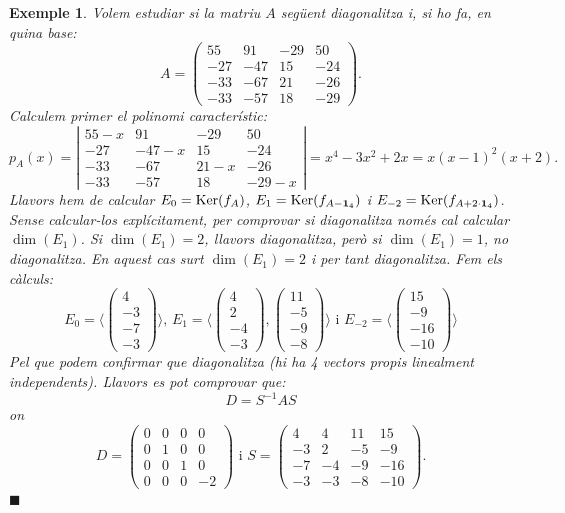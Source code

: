 \documentclass[
  11pt,
]{book}
\numberwithin{dummy}{section}
\theoremstyle{maincolornumbox}
\theoremstyle{blacknumex}
\newtheorem{exampleT}{Exemple}[chapter]
\theoremstyle{blacknumbox}
\theoremstyle{maincolornum}
\newenvironment{example}{\begin{exampleT}}{\hfill{\tiny\ensuremath{\blacksquare}}\end{exampleT}}
\begin{document}
\begin{example}
Volem estudiar si la matriu \(A\) següent diagonalitza i, si ho fa, en
quina base: \[A=\left(\begin{array}{rrrr}
55 & 91 & -29 & 50 \\
-27 & -47 & 15 & -24 \\
-33 & -67 & 21 & -26 \\
-33 & -57 & 18 & -29
\end{array}\right).\] Calculem primer el polinomi característic:
\[p_A(x)=\left|\begin{array}{cccc}
55-x & 91 & -29 & 50 \\
-27 & -47-x & 15 & -24 \\
-33 & -67 & 21-x & -26 \\
-33 & -57 & 18 & -29-x
\end{array}\right|=x^4-3x^2+2x=x(x-1)^2(x+2).\] Llavors hem de calcular
\(E_0=\operatorname{Ker}(f_A)\), \(E_1=\operatorname{Ker}(f_{A-\mathbf{1}_4})\) i
\(E_{-2}=\operatorname{Ker}(f_{A+2\cdot\mathbf{1}_4})\). Sense calcular-los explícitament, per
comprovar si diagonalitza només cal calcular \(\dim(E_1)\). Si
\(\dim(E_1)=2\), llavors diagonalitza, però si \(\dim(E_1)=1\), no
diagonalitza. En aquest cas surt \(\dim(E_1)=2\) i per tant diagonalitza.
Fem els càlculs:
\[E_0=\langle\begin{pmatrix}4\\-3\\-7\\-3\end{pmatrix}\rangle \text{, }
E_1=\langle\begin{pmatrix}4\\2\\-4\\-3\end{pmatrix},\begin{pmatrix}11\\-5\\-9\\-8\end{pmatrix}\rangle \text{ i }
E_{-2}=\langle\begin{pmatrix}15\\-9\\-16\\-10\end{pmatrix}\rangle\] Pel
que podem confirmar que diagonalitza (hi ha 4 vectors propis linealment
independents). Llavors es pot comprovar que: \[D=S^{-1}AS\] on
\[D=\left(\begin{array}{rrrr}
0 & 0 & 0 & 0 \\
0 & 1 & 0 & 0 \\
0 & 0 & 1 & 0 \\
0 & 0 & 0 & -2
\end{array}\right)
\text{ i }
S=\left(\begin{array}{rrrr}
4 & 4 & 11 & 15  \\
-3 & 2 & -5 & -9   \\
-7 & -4 & -9 & -16  \\
-3 & -3 & -8 & -10 
\end{array}\right).\]
\end{example}
\end{document}
